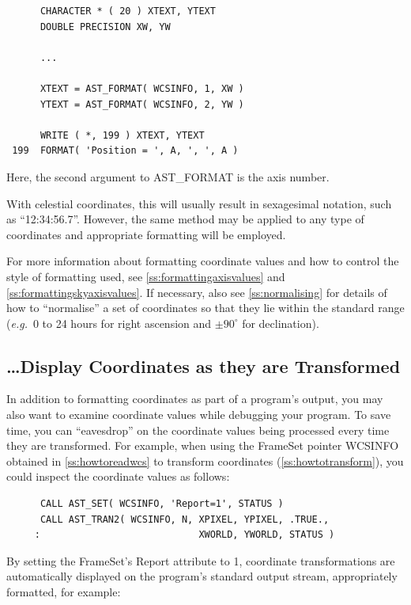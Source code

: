 \documentclass[twoside,11pt]{article}
\newcommand{\htmlref}[2]{#1}
\newcommand{\secref}[1]{\S\ref{#1}}
\renewcommand{\secref}[1]{\ref{#1}}
\begin{document}
\small
\begin{verbatim}
      CHARACTER * ( 20 ) XTEXT, YTEXT
      DOUBLE PRECISION XW, YW

      ...

      XTEXT = AST_FORMAT( WCSINFO, 1, XW )
      YTEXT = AST_FORMAT( WCSINFO, 2, YW )

      WRITE ( *, 199 ) XTEXT, YTEXT
 199  FORMAT( 'Position = ', A, ', ', A )
\end{verbatim}
\normalsize

Here, the second argument to \htmlref{AST\_FORMAT}{AST_FORMAT} is the axis number.

With celestial coordinates, this will usually result in sexagesimal
notation, such as ``12:34:56.7''. However, the same method may be
applied to any type of coordinates and appropriate formatting will be
employed.

For more information about formatting coordinate values and how to
control the style of formatting used, see
\secref{ss:formattingaxisvalues} and
\secref{ss:formattingskyaxisvalues}. If necessary, also see
\secref{ss:normalising} for details of how to ``normalise'' a set of
coordinates so that they lie within the standard range ({\em{e.g.}}\ 0
to 24 hours for right ascension and $\pm 90^\circ$ for
declination).

\subsection{\ldots Display Coordinates as they are Transformed}

In addition to formatting coordinates as part of a program's output,
you may also want to examine coordinate values while debugging your
program. To save time, you can ``eavesdrop'' on the coordinate values
being processed every time they are transformed. For example, when
using the \htmlref{FrameSet}{FrameSet} pointer WCSINFO obtained in
\secref{ss:howtoreadwcs} to transform coordinates
(\secref{ss:howtotransform}), you could inspect the coordinate values
as follows:

\small
\begin{verbatim}
      CALL AST_SET( WCSINFO, 'Report=1', STATUS )
      CALL AST_TRAN2( WCSINFO, N, XPIXEL, YPIXEL, .TRUE.,
     :                            XWORLD, YWORLD, STATUS )
\end{verbatim}
\normalsize

By setting the FrameSet's \htmlref{Report}{Report} attribute to 1, coordinate
transformations are automatically displayed on the program's standard
output stream, appropriately formatted, for example:
\end{document}
